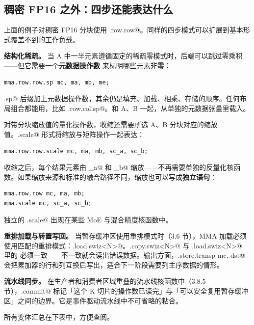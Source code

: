 \subsection*{稠密 FP16 之外：四步还能表达什么}

上面的例子对稠密 FP16 分块使用 \co@mma.row.row@。同样的四步模式可以扩展到基本形式覆盖不到的工作负载。

\textbf{结构化稀疏。} 当 A 中一半元素遵循固定的稀疏零模式时，后端可以跳过零乘积——但它需要一个\textbf{元数据操作数} \co@me@ 来标明哪些元素非零：

\begin{lstlisting}[language=croqtile,caption={一次稀疏收缩}]
mma.row.row.sp mc, ma, mb, me;
\end{lstlisting}

\co@.sp@ 后缀加上元数据操作数，其余仍是填充、加载、相乘、存储的顺序。任何布局组合都能用，比如 \co@mma.row.col.sp@。\co@me@ 和 A、B 一起，从单独的元数据张量里载入。

对带分块缩放值的量化操作数，收缩还需要所选 A、B 分块对应的缩放值。\co@.scale@ 形式将缩放与矩阵操作一起表达：

\begin{lstlisting}[language=croqtile,caption={一次带缩放的收缩}]
mma.row.row.scale mc, ma, mb, sc_a, sc_b;
\end{lstlisting}

收缩之后，每个结果元素由 \co@sc_a@ 和 \co@sc_b@ 缩放——不再需要单独的反量化核函数。如果缩放来源和标准的融合路径不同，缩放也可以写成\textbf{独立语句}：

\begin{lstlisting}[language=croqtile,caption={另一种收缩布局}]
mma.row.row mc, ma, mb;
mma.scale mc, sc_a, sc_b;
\end{lstlisting}

独立的 \co@mma.scale@ 出现在某些 MoE 与混合精度核函数中。

\textbf{重排加载与转置写回。} 当暂存缓冲区使用重排模式时（3.6 节），MMA 加载必须使用匹配的重排模式：\co@mma.load.swiz<N>@。\co@dma.copy.swiz<N>@ 与 \co@mma.load.swiz<N>@ 里的 \co@N@ 必须一致——不一致就会读出错误数据。输出方面，\co@mma.store.transp mc, dst@ 会把累加器的行和列互换后写出，适合下一阶段需要列主序数据的情形。

\textbf{流水线同步。} 在生产者和消费者区域重叠的流水线核函数中（3.8.5 节），\co@mma.commit@ 标记「这个 K 切片的操作数已读完」与「可以安全复用暂存缓冲区」之间的边界。它是事件驱动流水线中不可省略的粘合。

所有变体汇总在下表中，方便查阅。
